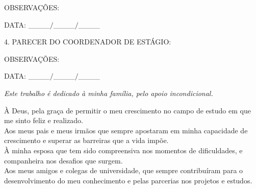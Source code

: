 \begin{folhadeaprovacao}
  	 OBSERVAÇÕES:
  		  		
  		  		 DATA: \_\_\_\_$/$\_\_\_\_$/$\_\_\_\_ \tab {}
  		\par
  		\vspace*{0.5cm}
  		 \ABNTEXchapterfont\large   4. PARECER DO COORDENADOR DE ESTÁGIO:
  		   		\normalsize 
  		
  		 OBSERVAÇÕES: 

  		 DATA: \_\_\_\_$/$\_\_\_\_$/$\_\_\_\_ \tab {}
  		 
   \begin{center}
    \vspace*{0.1cm}
    {\large\imprimirlocal}
    \par
    {\large\imprimirdata}
    \vspace*{0.5cm}
  \end{center}
  
\end{folhadeaprovacao}

\begin{dedicatoria}
   \vspace*{\fill}
   \centering
   \noindent
   \textit{ Este trabalho é dedicado à minha família, pelo apoio incondicional.} \vspace*{\fill}
\end{dedicatoria}

\begin{agradecimentos}
À Deus, pela graça de permitir o meu crescimento no campo de estudo em que me sinto feliz e realizado. \\

Aos meus pais e meus irmãos que sempre apostaram em minha capacidade de crescimento e superar as barreiras que a vida impõe.\\

À minha esposa que tem sido compreensiva nos momentos de dificuldades, e companheira nos desafios que surgem.\\

Aos meus amigos e colegas de universidade, que sempre contribuíram para o desenvolvimento do meu conhecimento e pelas parcerias nos projetos e estudos.


\end{agradecimentos}

